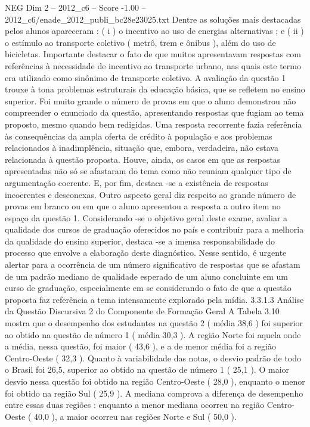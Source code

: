 \begin{textsample}{NEG Dim 2 – 2012\_c6 – Score -1.00 – 2012\_c6/enade\_2012\_publi\_bc28e23025.txt}
Dentre as soluções mais destacadas pelos alunos apareceram : ( i ) o incentivo ao uso de energias alternativas ; e ( ii ) o estímulo ao transporte coletivo ( metrô, trem e ônibus ), além do uso de bicicletas.
Importante destacar o fato de que muitos apresentavam respostas com referências à necessidade de incentivo ao transporte urbano, nas quais este termo era utilizado como sinônimo de transporte coletivo.
A avaliação da questão 1 trouxe à tona problemas estruturais da educação básica, que se refletem no ensino superior.
Foi muito grande o número de provas em que o aluno demonstrou não compreender o enunciado da questão, apresentando respostas que fugiam ao tema proposto, mesmo quando bem redigidas.
Uma resposta recorrente fazia referência às consequências da ampla oferta de crédito à população e aos problemas relacionados à inadimplência, situação que, embora, verdadeira, não estava relacionada à questão proposta.
Houve, ainda, os casos em que as respostas apresentadas não só se afastaram do tema como não reuniam qualquer tipo de argumentação coerente.
E, por fim, destaca -se a existência de respostas incoerentes e desconexas.
Outro aspecto geral diz respeito ao grande número de provas em branco ou em que o aluno apresentou a resposta a outro item no espaço da questão 1.
Considerando -se o objetivo geral deste exame, avaliar a qualidade dos cursos de graduação oferecidos no país e contribuir para a melhoria da qualidade do ensino superior, destaca -se a imensa responsabilidade do processo que envolve a elaboração deste diagnóstico.
Nesse sentido, é urgente alertar para a ocorrência de um número significativo de respostas que se afastam de um padrão mediano de qualidade esperado de um aluno concluinte em um curso de graduação, especialmente em se considerando o fato de que a questão proposta faz referência a tema intensamente explorado pela mídia. 3.3.1.3 Análise da Questão Discursiva 2 do Componente de Formação Geral A Tabela 3.10 mostra que o desempenho dos estudantes na questão 2 ( média 38,6 ) foi superior ao obtido na questão de número 1 ( média 30,3 ).
A região Norte foi aquela onde a média, nessa questão, foi maior ( 43,6 ), e a de menor média foi a região Centro-Oeste ( 32,3 ).
Quanto à variabilidade das notas, o desvio padrão de todo o Brasil foi 26,5, superior ao obtido na questão de número 1 ( 25,1 ).
O maior desvio nessa questão foi obtido na região Centro-Oeste ( 28,0 ), enquanto o menor foi obtido na região Sul ( 25,9 ).
A mediana comprova a diferença de desempenho entre essas duas regiões : enquanto a menor mediana ocorreu na região Centro-Oeste ( 40,0 ), a maior ocorreu nas regiões Norte e Sul ( 50,0 ).

\end{textsample}

